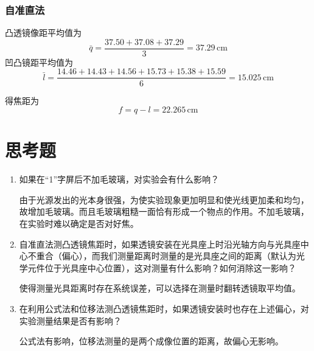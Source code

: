 \documentclass{article}
\begin{document}
\subsubsection*{自准直法}
凸透镜像距平均值为
\[\bar{q}=\frac{37.50+37.08+37.29}{3}=37.29\,\mathrm{cm}\]
凹凸镜距平均值为
\[\bar{l}=\frac{14.46+14.43+14.56+15.73+15.38+15.59}{6}=15.025\,\mathrm{cm}\]

得焦距为\[f=q-l=22.265\,\mathrm{cm}\]



\section*{思考题}
\begin{enumerate}
    \item 如果在“1”字屏后不加毛玻璃，对实验会有什么影响？
    
    由于光源发出的光本身很强，为使实验现象更加明显和使光线更加柔和均匀，故增加毛玻璃。而且毛玻璃粗糙一面恰有形成一个物点的作用。不加毛玻璃，在实验时难以确定是否对好焦。

    \item 自准直法测凸透镜焦距时，如果透镜安装在光具座上时沿光轴方向与光具座中心不重合（偏心），而我们测量距离时测量的是光具座之间的距离（默认为光学元件位于光具座中心位置），这对测量有什么影响？如何消除这一影响？
    
    使得测量光具距离时存在系统误差，可以选择在测量时翻转透镜取平均值。

    \item 在利用公式法和位移法测凸透镜焦距时，如果透镜安装时也存在上述偏心，对实验测量结果是否有影响？
    
    公式法有影响，位移法测量的是两个成像位置的距离，故偏心无影响。
\end{enumerate}
\end{document}

